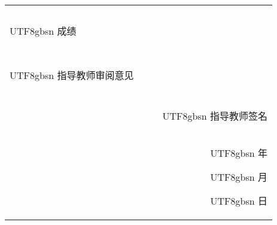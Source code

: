 \documentclass[12pt,a4paper]{article}
\newcommand{\SONG}[1]{
{%
\begin{CJK}{UTF8}{gbsn}
#1%
\end{CJK}%
}}
\begin{document}
\begin{longtable}{|c|c|c|c|c|c|}
{	 } \\  
	
	\newpage

	\multicolumn{6}{|c|}{} \\
    \multicolumn{1}{|l}{\SONG{成绩}} & \multicolumn{5}{l|}{} \\
    
	\multicolumn{6}{|c|}{} \\
	\multicolumn{6}{|c|}{} \\
		
	\multicolumn{2}{|l}{\SONG{指导教师审阅意见} } 	& \multicolumn{4}{l|}{}  \\

	\multicolumn{6}{|l|}{} \\

	\multicolumn{4}{|c}{} & \multicolumn{2}{l|}{\SONG{指导教师签名\underline{\qquad\qquad\qquad}}} \\

	\multicolumn{6}{|r|}{ \SONG{年}\quad \SONG{月}\quad \SONG{日}} \\
	
    \hline
\end{longtable}
\end{document}
